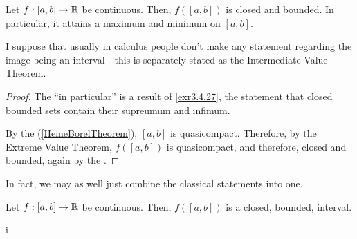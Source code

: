 \begin{crl}\label{ClassicalExtremeValueTheorem}
Let $f:[a,b]\rightarrow \mathbb{R}$ be continuous.  Then, $f([a,b])$ is closed and bounded.  In particular, it attains a maximum and minimum on $[a,b]$.
\begin{rmk}
I suppose that usually in calculus people don't make any statement regarding the image being an interval---this is separately stated as the Intermediate Value Theorem.
\end{rmk}
\begin{proof}
The ``in particular'' is a result of \cref{exr3.4.27}, the statement that closed bounded sets contain their supreumum and infimum.

By the  (\cref{HeineBorelTheorem}), $[a,b]$ is quasicompact.  Therefore, by the Extreme Value Theorem, $f([a,b])$ is quasicompact, and therefore, closed and bounded, again by the .
\end{proof}
\end{crl}

In fact, we may as well just combine the classical statements into one.
\begin{crl}\label{ClassicalIntermediateExtremeValueTheorem}
Let $f:[a,b]\rightarrow \mathbb{R}$ be continuous.  Then, $f([a,b])$ is a closed, bounded, interval.
\end{crl}i